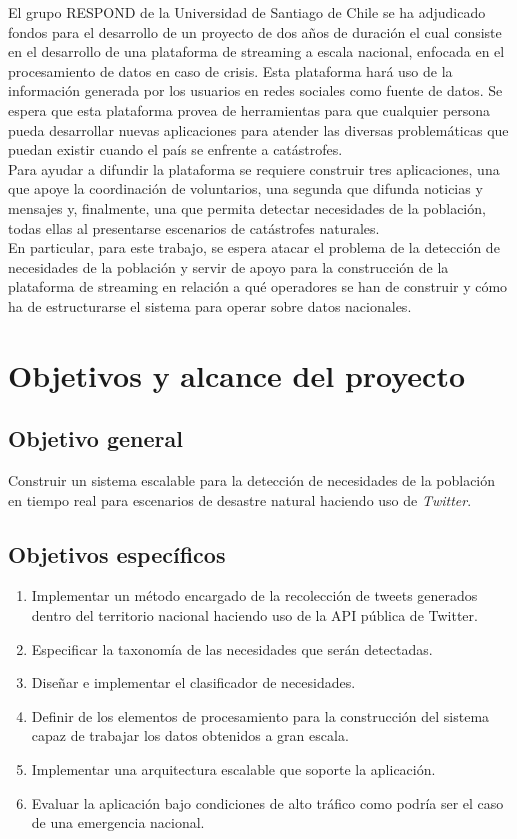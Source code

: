 El grupo RESPOND de la Universidad de Santiago de Chile se ha adjudicado fondos para el desarrollo de un proyecto de dos años de duración el cual consiste en el desarrollo de una plataforma de streaming a escala nacional, enfocada en el procesamiento de datos en caso de crisis. Esta plataforma hará uso de la información generada por los usuarios en redes sociales como fuente de datos. Se espera que esta plataforma provea de herramientas para que cualquier persona pueda desarrollar nuevas aplicaciones para atender las diversas problemáticas que puedan existir cuando el país se enfrente a catástrofes.\\

Para ayudar a difundir la plataforma se requiere construir tres aplicaciones, una que apoye la coordinación de voluntarios, una segunda que difunda noticias y mensajes y, finalmente, una que permita detectar necesidades de la población, todas ellas al presentarse escenarios de catástrofes naturales.\\

En particular, para este trabajo, se espera atacar el problema de la detección de necesidades de la población y servir de apoyo para la construcción de la plataforma de streaming en relación a qué operadores se han de construir y cómo ha de estructurarse el sistema para operar sobre datos nacionales.


\section{Objetivos y alcance del proyecto}
\label{intro:objetivos}

\subsection{Objetivo general}
	Construir un sistema escalable para la detección de necesidades de la población en tiempo real para escenarios de desastre natural haciendo uso de \textit{Twitter}.

\subsection{Objetivos específicos}
\begin{enumerate}
\item	Implementar un método encargado de la recolección de tweets generados dentro del territorio nacional haciendo uso de la API pública de Twitter.
\item	Especificar la taxonomía de las necesidades que serán detectadas.
\item	Diseñar e implementar el clasificador de necesidades.
\item	Definir de los elementos de procesamiento para la construcción del sistema capaz de trabajar los datos obtenidos a gran escala.
\item	Implementar una arquitectura escalable que soporte la aplicación.
\item	Evaluar la aplicación bajo condiciones de alto tráfico como podría ser el caso de una emergencia nacional.
\end{enumerate}

